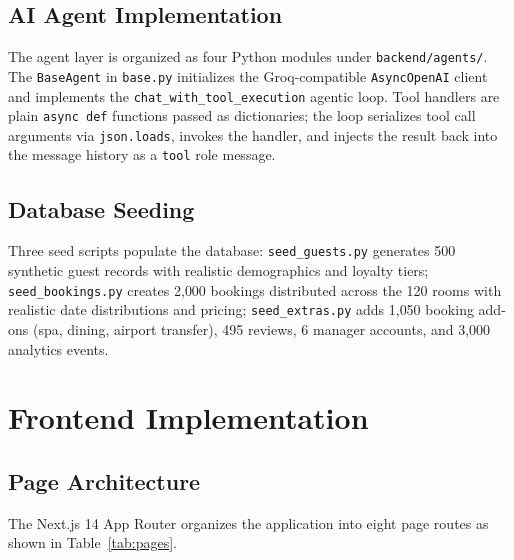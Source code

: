 \documentclass[11pt,a4paper]{report}
\begin{document}
\subsection{AI Agent Implementation}

The agent layer is organized as four Python modules under \texttt{backend/agents/}. The \texttt{BaseAgent} in \texttt{base.py} initializes the Groq-compatible \texttt{AsyncOpenAI} client and implements the \texttt{chat\_with\_tool\_execution} agentic loop. Tool handlers are plain \texttt{async def} functions passed as dictionaries; the loop serializes tool call arguments via \texttt{json.loads}, invokes the handler, and injects the result back into the message history as a \texttt{tool} role message.

\subsection{Database Seeding}

Three seed scripts populate the database: \texttt{seed\_guests.py} generates 500 synthetic guest records with realistic demographics and loyalty tiers; \texttt{seed\_bookings.py} creates 2{,}000 bookings distributed across the 120 rooms with realistic date distributions and pricing; \texttt{seed\_extras.py} adds 1{,}050 booking add-ons (spa, dining, airport transfer), 495 reviews, 6 manager accounts, and 3{,}000 analytics events.

\section{Frontend Implementation}

\subsection{Page Architecture}

The Next.js 14 App Router organizes the application into eight page routes as shown in Table~\ref{tab:pages}.
\end{document}
